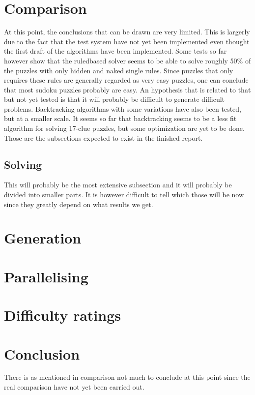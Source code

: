 \documentclass[a4paper,11pt]{kth-mag}
\begin{document}
\section{Comparison}

At this point, the conclusions that can be drawn are very limited. This is largerly due to the fact that the test system have not yet been implemented even thought the first draft of the algorithms have been implemented. Some tests so far however show that the ruledbased solver seems to be able to solve roughly 50\% of the puzzles with only hidden and naked single rules. Since puzzles that only requires these rules are generally regarded as very easy puzzles, one can conclude that most sudoku puzzles probably are easy. An hypothesis that is related to that but not yet tested is that it will probably be difficult to generate difficult problems. Backtracking algorithms with some variations have also been tested, but at a smaller scale. It seems so far that backtracking seems to be a less fit algorithm for solving 17-clue puzzles, but some optimization are yet to be done. 
Those are the subsections expected to exist in the finished report.
\subsection{Solving}

This will probably be the most extensive subsection and it will probably be divided into smaller parts. It is however difficult to tell which those will be now since they greatly depend on what results we get.
\section{Generation}

\section{Parallelising}

\section{Difficulty ratings}


\section{Conclusion}

There is as mentioned in comparison not much to conclude at this point since the real comparison have not yet been carried out.
\end{document}
